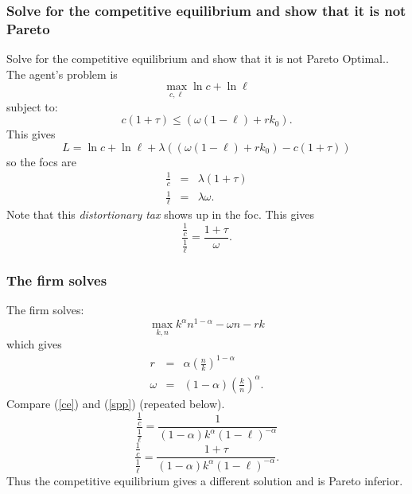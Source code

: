 \documentclass[aspectratio=169]{ltx-talk}
\begin{document}
\begin{frame}
\frametitle{Solve for the competitive equilibrium and show that it is not Pareto}
Solve for the competitive equilibrium and show that it is not Pareto
Optimal.. The agent's problem is
\begin{equation*}
\underset{c,\ell }{\max }\ln c+\ln \ell
\end{equation*}%
subject to:%
\begin{equation*}
c\left( 1+\tau \right) \leq \left( \omega \left( 1-\ell \right)
+rk_{0}\right) .
\end{equation*}%
This gives%
\begin{equation*}
L=\ln c+\ln \ell +\lambda \left( \left( \omega \left( 1-\ell \right)
+rk_{0}\right) -c\left( 1+\tau \right) \right)
\end{equation*}%
so the focs are%
\begin{eqnarray*}
\frac{1}{c} &=&\lambda \left( 1+\tau \right) \\
\frac{1}{\ell } &=&\lambda \omega .
\end{eqnarray*}%
Note that this \textit{distortionary tax} shows up in the foc. This gives 
\begin{equation*}
\frac{\frac{1}{c}}{\frac{1}{\ell }}=\frac{1+\tau }{\omega }.
\end{equation*}
\end{frame}

\begin{frame}
\frametitle{The firm solves}
The firm solves:%
\begin{equation*}
\underset{k,n}{\max }k^{\alpha }n^{1-\alpha }-\omega n-rk
\end{equation*}%
which gives 
\begin{eqnarray*}
r &=&\alpha \left( \frac{n}{k}\right) ^{1-\alpha } \\
\omega &=&\left( 1-\alpha \right) \left( \frac{k}{n}\right) ^{\alpha }.
\end{eqnarray*}%
Compare (\ref{ce}) and (\ref{spp}) (repeated below).%
\begin{equation*}
\frac{\frac{1}{c}}{\frac{1}{\ell }}=\frac{1}{\left( 1-\alpha \right)
k^{\alpha }\left( 1-\ell \right) ^{-\alpha }}
\end{equation*}%
\begin{equation}
\frac{\frac{1}{c}}{\frac{1}{\ell }}=\frac{1+\tau }{\left( 1-\alpha \right)
k^{\alpha }\left( 1-\ell \right) ^{-\alpha }}.  \label{ce}
\end{equation}%
Thus the competitive equilibrium gives a different solution and is Pareto
inferior.
\end{frame}
\end{document}
